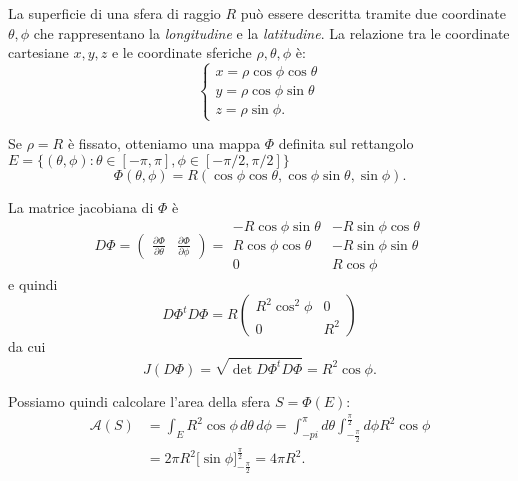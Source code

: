 \documentclass[italian,a4paper]{scrartcl}
\begin{document}
\begin{example}
La superficie di una sfera di raggio $R$ può essere descritta tramite
due coordinate $\theta,\phi$ che rappresentano la \emph{longitudine} e
la \emph{latitudine}. La relazione tra le coordinate cartesiane
$x,y,z$ e le coordinate sferiche $\rho,\theta,\phi$ è:
\[
\begin{cases}
  x = \rho \cos \phi \cos \theta\\
  y = \rho \cos \phi \sin \theta\\
  z = \rho \sin \phi.
\end{cases}
\]

Se $\rho=R$ è fissato, otteniamo una mappa $\Phi$ definita sul
rettangolo $E=\{(\theta,\phi)\colon \theta \in [-\pi,\pi],
\phi\in[-\pi/2, \pi/2]\}$
\[
\Phi(\theta,\phi) = R (\cos \phi \cos \theta,
\cos \phi \sin \theta,
\sin \phi).
\]

La matrice jacobiana di $\Phi$ è 
\[
D\Phi = 
\begin{pmatrix}
\displaystyle
\frac{\partial \Phi}{\partial \theta} &
\displaystyle
\frac{\partial \Phi}{\partial \phi}
\end{pmatrix}
=
\begin{matrix}
-R\cos \phi\sin \theta & -R \sin \phi\cos \theta\\
R\cos \phi \cos \theta & -R \sin \phi \sin \theta \\
0 & R\cos \phi
\end{matrix}
\]
e quindi
\[
D\Phi^t D\Phi = 
R\begin{pmatrix}
R^2\cos^2 \phi & 0 \\
0 & R^2
\end{pmatrix}
\]
da cui
\[
J(D\Phi) = \sqrt{\det D\Phi^t D\Phi} = R^2\cos \phi.
\]

Possiamo quindi calcolare l'area della sfera $S=\Phi(E)$:
\begin{align*}
\mathcal A(S) &= \int_E R^2 \cos \phi \,d \theta\, d \phi
=\int_{-pi}^\pi d \theta \int_{-\frac \pi 2}^{\frac \pi 2} d\phi R^2
\cos\phi
\\
&= 2\pi R^2\big[\sin \phi\big]_{-\frac \pi 2}^{\frac \pi 2} 
= 4 \pi R^2.
\end{align*}
\end{example}
\end{document}
